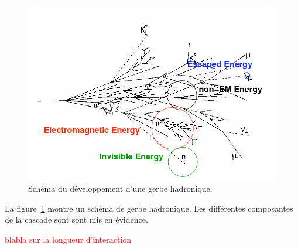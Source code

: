 \begin{figure}[!h]
  \begin{center}
    \includegraphics[width=.8\textwidth]{SDHCAL/figs/had-shower.png}
    \caption{Schéma du développement d'une gerbe hadronique.}
    \label{fig:showerScheme}
  \end{center}
\end{figure}
La figure~\ref{fig:showerScheme} montre un schéma de gerbe hadronique. Les différentes composantes de la cascade sont sont mis en évidence.

\textcolor{red}{blabla sur la longueur d'interaction}


